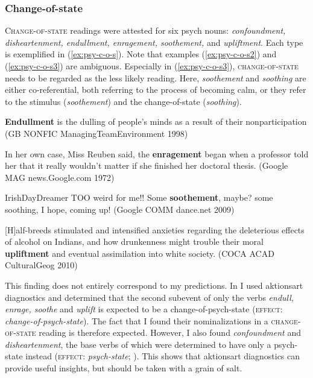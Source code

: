 \subsubsection{Change-of-state}
\label{sec:psy-output-survey-cos}

\textsc{Change-of-state} readings were attested for six psych nouns: \textit{confoundment, disheartenment, endullment, enragement, soothement,} and \textit{upliftment}. Each type is exemplified in (\ref{ex:psy-c-o-s}). Note that examples (\ref{ex:psy-c-o-s2}) and (\ref{ex:psy-c-o-s3}) are ambiguous. Especially in (\ref{ex:psy-c-o-s3}), \textsc{change-of-state} needs to be regarded as the less likely reading. Here, \textit{soothement} and \textit{soothing} are either co-referential, both referring to the process of becoming calm, or they refer to the stimulus (\textit{soothement}) and the change-of-state (\textit{soothing}).  

\begin{exe}\sloppy
	\ex \label{ex:psy-c-o-s}
	\begin{xlist}
	\item \label{ex:psy-c-o-s1} \textbf{Endullment} is the dulling of people's minds as a result of their nonparticipation {\small(\acs{GB} NONFIC ManagingTeamEnvironment 1998)} 
	\item \label{ex:psy-c-o-s2} In her own case, Miss Reuben said, the \textbf{enragement} began when a professor told her that it really wouldn't matter if she finished her doctoral thesis. {\small(Google MAG news.Google.com 1972)} 
	\item \label{ex:psy-c-o-s3} IrishDayDreamer \textendash TOO weird for me!! Some \textbf{soothement}, maybe? some soothing, I hope, coming up! {\small(Google COMM dance.net 2009)} 
	\item \label{ex:psy-c-o-s4} [H]alf-breeds stimulated and intensified anxieties regarding the deleterious effects of alcohol on Indians, and how drunkenness might trouble their moral \textbf{upliftment} and eventual assimilation into white society. {\small(\acs{COCA} ACAD CulturalGeog 2010)} 
	\end{xlist}
\end{exe}

\noindent This finding does not entirely correspond to my predictions. In  I used aktionsart diagnostics and determined that the second subevent of only the verbs \textit{endull, enrage, soothe} and \textit{uplift} is expected to be a change-of-psych-state (\textsc{effect:} \textit{change-of-psych-state}). 
The fact that I found their nominalizations in a \textsc{change-of-state} reading is therefore expected.
However, I also found \textit{confoundment} and \textit{disheartenment}, the base verbs of which were determined to have only a psych-state instead (\textsc{effect:} \textit{psych-state}; ). 
This shows that aktionsart diagnostics can provide useful insights, but should be taken with a grain of salt. 

